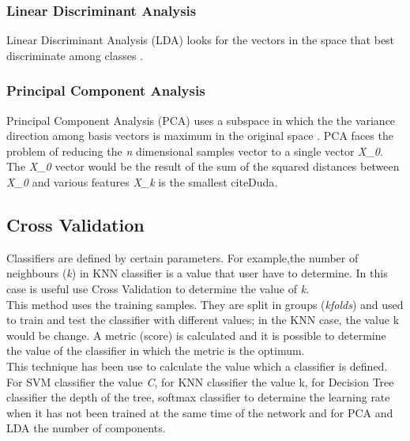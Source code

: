 \subsubsection{Linear Discriminant Analysis}
Linear Discriminant Analysis (LDA) looks for the vectors in the space that best discriminate among classes \cite{PCAvsLDA}.

\subsubsection{Principal Component Analysis}
Principal Component Analysis (PCA) uses a subspace in which the the variance direction among basis vectors is maximum in the original space \cite{PCAvsLDA}. PCA faces the problem of reducing the \textit{n} dimensional samples vector to a single vector \textit{X\_0}. The \textit{X\_0} vector would be the result of the sum of the squared distances between \textit{X\_0} and various features \textit{X\_k} is the smallest cite{Duda}.\\



\subsection{Cross Validation}
Classifiers are defined by certain parameters. For example,the number of neighbours (\textit{k}) in KNN classifier is a value that user have to determine. In this case is useful use Cross Validation to determine the value of \textit{k}.\\

This method uses the training samples. They are split in groups (\textit{kfolds}) and used to train and test the classifier with different values; in the KNN case, the value k would be change. A metric (score) is calculated and it is possible to determine the value of the classifier in which the metric is the optimum.\\

This technique has been use to calculate the value which a classifier is defined. For SVM classifier the value \textit{C}, for KNN classifier the value {k}, for Decision Tree classifier the depth of the tree, softmax classifier to determine the learning rate when it has not been trained at the same time of the network and for PCA and LDA the number of components. \\
 